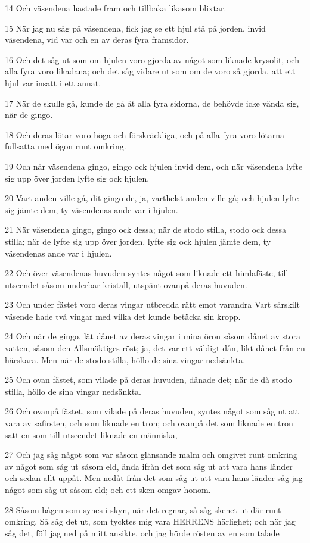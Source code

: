 \par 14 Och väsendena hastade fram och tillbaka likasom blixtar.
\par 15 När jag nu såg på väsendena, fick jag se ett hjul stå på jorden, invid väsendena, vid var och en av deras fyra framsidor.
\par 16 Och det såg ut som om hjulen voro gjorda av något som liknade krysolit, och alla fyra voro likadana; och det såg vidare ut som om de voro så gjorda, att ett hjul var insatt i ett annat.
\par 17 När de skulle gå, kunde de gå åt alla fyra sidorna, de behövde icke vända sig, när de gingo.
\par 18 Och deras lötar voro höga och förskräckliga, och på alla fyra voro lötarna fullsatta med ögon runt omkring.
\par 19 Och när väsendena gingo, gingo ock hjulen invid dem, och när väsendena lyfte sig upp över jorden lyfte sig ock hjulen.
\par 20 Vart anden ville gå, dit gingo de, ja, varthelst anden ville gå; och hjulen lyfte sig jämte dem, ty väsendenas ande var i hjulen.
\par 21 När väsendena gingo, gingo ock dessa; när de stodo stilla, stodo ock dessa stilla; när de lyfte sig upp över jorden, lyfte sig ock hjulen jämte dem, ty väsendenas ande var i hjulen.
\par 22 Och över väsendenas huvuden syntes något som liknade ett himlafäste, till utseendet såsom underbar kristall, utspänt ovanpå deras huvuden.
\par 23 Och under fästet voro deras vingar utbredda rätt emot varandra Vart särskilt väsende hade två vingar med vilka det kunde betäcka sin kropp.
\par 24 Och när de gingo, lät dånet av deras vingar i mina öron såsom dånet av stora vatten, såsom den Allsmäktiges röst; ja, det var ett väldigt dån, likt dånet från en härskara. Men när de stodo stilla, höllo de sina vingar nedsänkta.
\par 25 Och ovan fästet, som vilade på deras huvuden, dånade det; när de då stodo stilla, höllo de sina vingar nedsänkta.
\par 26 Och ovanpå fästet, som vilade på deras huvuden, syntes något som såg ut att vara av safirsten, och som liknade en tron; och ovanpå det som liknade en tron satt en som till utseendet liknade en människa,
\par 27 Och jag såg något som var såsom glänsande malm och omgivet runt omkring av något som såg ut såsom eld, ända ifrån det som såg ut att vara hans länder och sedan allt uppåt. Men nedåt från det som såg ut att vara hans länder såg jag något som såg ut såsom eld; och ett sken omgav honom.
\par 28 Såsom bågen som synes i skyn, när det regnar, så såg skenet ut där runt omkring. Så såg det ut, som tycktes mig vara HERRENS härlighet; och när jag såg det, föll jag ned på mitt ansikte, och jag hörde rösten av en som talade

